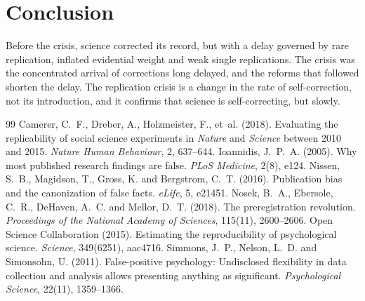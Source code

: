 \documentclass{situationist-preprint}
\begin{document}
\section{Conclusion}

Before the crisis, science corrected its record, but with a delay governed by rare replication, inflated evidential weight and weak single replications. The crisis was the concentrated arrival of corrections long delayed, and the reforms that followed shorten the delay. The replication crisis is a change in the rate of self-correction, not its introduction, and it confirms that science is self-correcting, but slowly.

\begin{thebibliography}{99}\small
{} Camerer, C.~F., Dreber, A., Holzmeister, F., et~al. (2018). Evaluating the replicability of social science experiments in \emph{Nature} and \emph{Science} between 2010 and 2015. \emph{Nature Human Behaviour}, 2, 637--644.
 Ioannidis, J.~P.~A. (2005). Why most published research findings are false. \emph{PLoS Medicine}, 2(8), e124.
 Nissen, S.~B., Magidson, T., Gross, K. and Bergstrom, C.~T. (2016). Publication bias and the canonization of false facts. \emph{eLife}, 5, e21451.
 Nosek, B.~A., Ebersole, C.~R., DeHaven, A.~C. and Mellor, D.~T. (2018). The preregistration revolution. \emph{Proceedings of the National Academy of Sciences}, 115(11), 2600--2606.
 Open Science Collaboration (2015). Estimating the reproducibility of psychological science. \emph{Science}, 349(6251), aac4716.
 Simmons, J.~P., Nelson, L.~D. and Simonsohn, U. (2011). False-positive psychology: Undisclosed flexibility in data collection and analysis allows presenting anything as significant. \emph{Psychological Science}, 22(11), 1359--1366.
\end{thebibliography}
\end{document}

